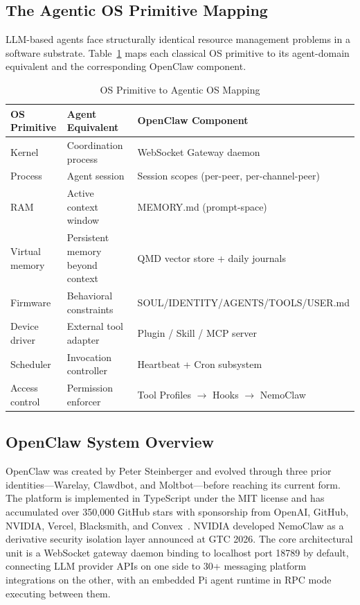 \documentclass[journal]{IEEEtran}
\begin{document}
\subsection{The Agentic OS Primitive Mapping}

LLM-based agents face structurally identical resource management problems in a
software substrate. Table~\ref{tab:mapping} maps each classical OS primitive to
its agent-domain equivalent and the corresponding OpenClaw component.

\begin{table}[!t]
\renewcommand{\arraystretch}{1.3}
\caption{OS Primitive to Agentic OS Mapping}
\label{tab:mapping}
\centering
\begin{tabular}{p{1.6cm}p{2.2cm}p{3.2cm}}
\toprule
\textbf{OS Primitive} & \textbf{Agent Equivalent} & \textbf{OpenClaw Component} \\
\midrule
Kernel & Coordination process & WebSocket Gateway daemon \\
Process & Agent session & Session scopes (per-peer, per-channel-peer) \\
RAM & Active context window & MEMORY.md (prompt-space) \\
Virtual memory & Persistent memory beyond context & QMD vector store + daily journals \\
Firmware & Behavioral constraints & SOUL/IDENTITY/AGENTS/TOOLS/USER.md \\
Device driver & External tool adapter & Plugin / Skill / MCP server \\
Scheduler & Invocation controller & Heartbeat + Cron subsystem \\
Access control & Permission enforcer & Tool Profiles $\to$ Hooks $\to$ NemoClaw \\
\bottomrule
\end{tabular}
\end{table}

\subsection{OpenClaw System Overview}

OpenClaw was created by Peter Steinberger and evolved through three prior
identities---Warelay, Clawdbot, and Moltbot---before reaching its current
form. The platform is implemented in TypeScript under the MIT license and has
accumulated over 350,000 GitHub stars with sponsorship from OpenAI, GitHub,
NVIDIA, Vercel, Blacksmith, and Convex~\cite{openclaw2024github}. NVIDIA
developed NemoClaw as a derivative security isolation layer announced at GTC
2026. The core architectural unit is a WebSocket gateway daemon binding to
localhost port 18789 by default, connecting LLM provider APIs on one side to
30+ messaging platform integrations on the other, with an embedded Pi agent
runtime in RPC mode executing between them.
\end{document}
